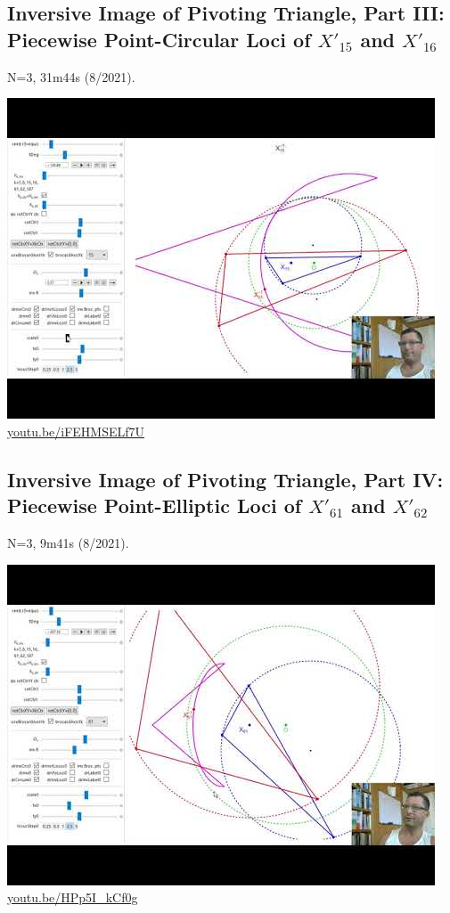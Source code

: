 \documentclass[12pt]{amsart}
\begin{document}
\subsection{Inversive Image of Pivoting Triangle, Part III: Piecewise Point-Circular Loci of $X'_{15}$ and $X'_{16}$}
\label{vid:iFEHMSELf7U}
\noindent N=3, 31m44s (8/2021). 
\begin{center}\includegraphics[width=.5\textwidth]{pics/iFEHMSELf7U.jpg} \\ 
\href{https://youtu.be/iFEHMSELf7U}{\url{youtu.be/iFEHMSELf7U}}\end{center}
% 
\subsection{Inversive Image of Pivoting Triangle, Part IV: Piecewise Point-Elliptic Loci of $X'_{61}$ and $X'_{62}$}
\label{vid:HPp5I_kCf0g}
\noindent N=3, 9m41s (8/2021). 
\begin{center}\includegraphics[width=.5\textwidth]{pics/HPp5I_kCf0g.jpg} \\ 
\href{https://youtu.be/HPp5I_kCf0g}{\url{youtu.be/HPp5I\_kCf0g}}\end{center}
% 
\end{document}
